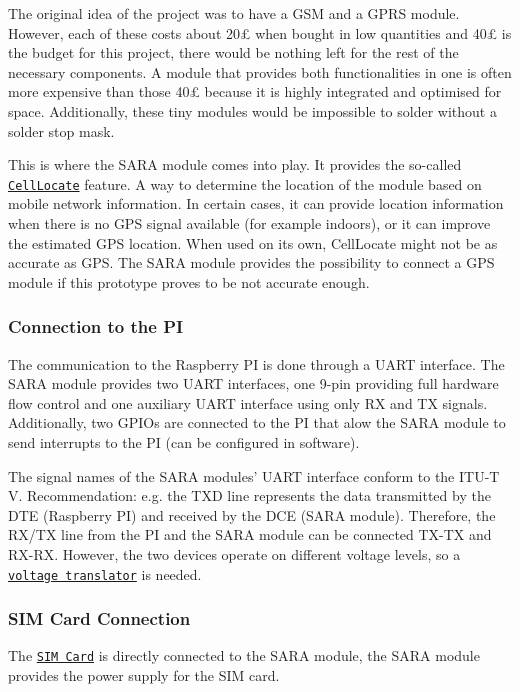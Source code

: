 The original idea of the project was to have a G\+SM and a G\+P\+RS module. However, each of these costs about 20£ when bought in low quantities and 40£ is the budget for this project, there would be nothing left for the rest of the necessary components. A module that provides both functionalities in one is often more expensive than those 40£ because it is highly integrated and optimised for space. Additionally, these tiny modules would be impossible to solder without a solder stop mask.

This is where the S\+A\+RA module comes into play. It provides the so-\/called \href{./uBlox-and-CellLocate}{\tt {\ttfamily Cell\+Locate}} feature. A way to determine the location of the module based on mobile network information. In certain cases, it can provide location information when there is no G\+PS signal available (for example indoors), or it can improve the estimated G\+PS location. When used on its own, Cell\+Locate might not be as accurate as G\+PS. The S\+A\+RA module provides the possibility to connect a G\+PS module if this prototype proves to be not accurate enough.

\subsubsection*{Connection to the PI}

The communication to the Raspberry PI is done through a U\+A\+RT interface. The S\+A\+RA module provides two U\+A\+RT interfaces, one 9-\/pin providing full hardware flow control and one auxiliary U\+A\+RT interface using only RX and TX signals. Additionally, two G\+P\+I\+Os are connected to the PI that alow the S\+A\+RA module to send interrupts to the PI (can be configured in software).

The signal names of the S\+A\+RA modules’ U\+A\+RT interface conform to the I\+T\+U-\/T V. Recommendation\+: e.\+g. the T\+XD line represents the data transmitted by the D\+TE (Raspberry PI) and received by the D\+CE (S\+A\+RA module). Therefore, the R\+X/\+TX line from the PI and the S\+A\+RA module can be connected T\+X-\/\+TX and R\+X-\/\+RX. However, the two devices operate on different voltage levels, so a \href{#voltage-translator}{\tt voltage translator} is needed.

\subsubsection*{S\+IM Card Connection}

The \href{#sim-card}{\tt S\+IM Card} is directly connected to the S\+A\+RA module, the S\+A\+RA module provides the power supply for the S\+IM card.

